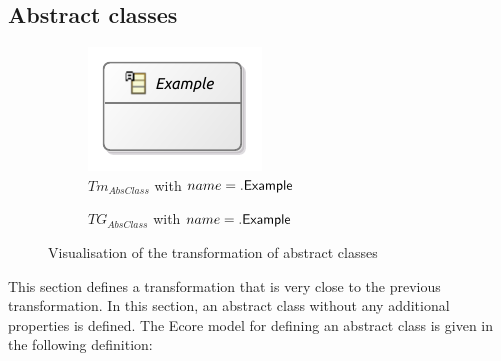 \subsection{Abstract classes}
\label{subsec:library_of_transformations:type_level_transformations:abstract_classes}

\begin{figure}[H]
    \centering
    \begin{subfigure}{0.45\textwidth}
        \centering
        \includegraphics{images/05_library_of_transformations/02_type_level_transformations/02_abstract_classes/abstract_class_type.pdf}
        \caption{$Tm_{AbsClass}$ with $name = .\mathsf{Example}$}
        \label{fig:library_of_transformations:type_level_transformations:abstract_classes:visualisation:ecore}
    \end{subfigure}
    \begin{subfigure}{0.45\textwidth}
        \centering
        
        \caption{$TG_{AbsClass}$ with $name = .\mathsf{Example}$}
        \label{fig:library_of_transformations:type_level_transformations:abstract_classes:visualisation:groove}
    \end{subfigure}
    \caption{Visualisation of the transformation of abstract classes}
    \label{fig:library_of_transformations:type_level_transformations:abstract_classes:visualisation}
\end{figure}

This section defines a transformation that is very close to the previous transformation. In this section, an abstract class without any additional properties is defined. The Ecore model for defining an abstract class is given in the following definition:

